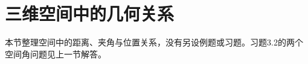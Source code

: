 \par\addvspace{12pt}

\section{三维空间中的几何关系}

\label{sol:sec:vector:2}

本节整理空间中的距离、夹角与位置关系，没有另设例题或习题。习题3.2的两个空间角问题见上一节解答。
